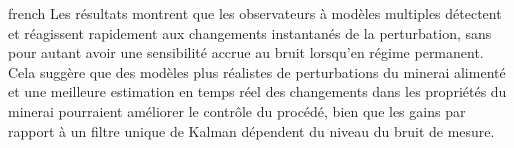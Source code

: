 \begin{otherlanguage*}{french}
Les résultats montrent que les observateurs à modèles multiples détectent et réagissent rapidement aux changements instantanés de la perturbation, sans pour autant avoir une sensibilité accrue au bruit lorsqu’en régime permanent.  Cela suggère que des modèles plus réalistes de perturbations du minerai alimenté et une meilleure estimation en temps réel des changements dans les propriétés du minerai pourraient améliorer le contrôle du procédé, bien que les gains par rapport à un filtre unique de Kalman dépendent du niveau du bruit de mesure.

\end{otherlanguage*}
